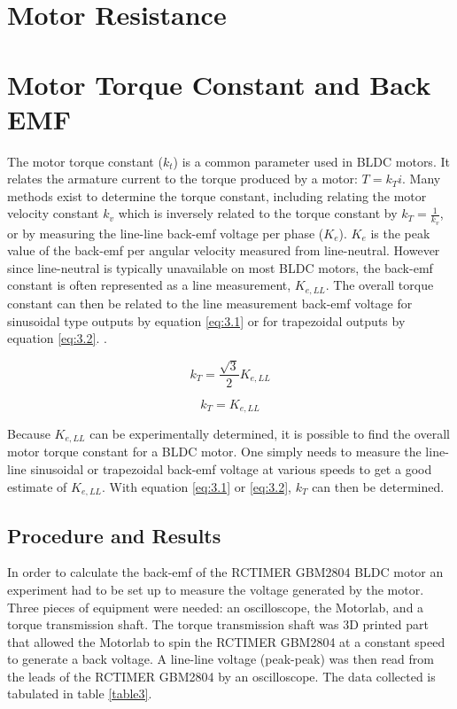 
\section{Motor Resistance}

\section{Motor Torque Constant and Back EMF}
The motor torque constant (\(k_t\)) is a common parameter used in BLDC motors. It relates the armature current to the torque produced by a motor: \(T = k_T i \). Many methods exist to determine the torque constant, including relating the motor velocity constant \(k_v\) which is inversely related to the torque constant by \(k_T = \frac{1}{k_v} \), or by measuring the line-line back-emf voltage per phase (\(K_e\)). \(K_e\) is the peak value of the back-emf per angular velocity measured from line-neutral. However since line-neutral is typically unavailable on most BLDC motors, the back-emf constant is often represented as a line measurement, \(K_{e,LL}\). The overall torque constant can then be related to the line measurement back-emf voltage for sinusoidal type outputs by equation \ref{eq:3.1} or for trapezoidal outputs by equation \ref{eq:3.2}. \citep{5}. 

\begin{equation} \label{eq:3.1}
k_T = \frac{\sqrt{3}}{2} K_{e,LL}
\end{equation}

\begin{equation} \label{eq:3.2}
k_T = K_{e,LL}
\end{equation}

Because \(K_{e,LL}\) can be experimentally determined, it is possible to find the overall motor torque constant for a BLDC motor. One simply needs to measure the line-line sinusoidal or trapezoidal back-emf voltage at various speeds to get a good estimate of \(K_{e,LL}\). With equation \ref{eq:3.1} or \ref{eq:3.2}, \(k_T\) can then be determined.

\subsection{Procedure and Results}
In order to calculate the back-emf of the RCTIMER GBM2804 BLDC motor an experiment had to be set up to measure the voltage generated by the motor. Three pieces of equipment were needed: an oscilloscope, the Motorlab, and a torque transmission shaft. The torque transmission shaft was 3D printed part that allowed the Motorlab to spin the RCTIMER GBM2804 at a constant speed to generate a back voltage. A line-line voltage (peak-peak) was then read from the leads of the RCTIMER GBM2804 by an oscilloscope. The data collected is tabulated in table \ref{table3}.

